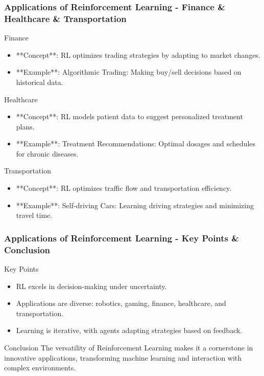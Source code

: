\documentclass[aspectratio=169]{beamer}
\begin{document}
\begin{frame}[fragile]
    \frametitle{Applications of Reinforcement Learning - Finance \& Healthcare \& Transportation}
    \begin{block}{Finance}
        \begin{itemize}
            \item **Concept**: RL optimizes trading strategies by adapting to market changes.
            \item **Example**: Algorithmic Trading: Making buy/sell decisions based on historical data.
        \end{itemize}
    \end{block}

    \begin{block}{Healthcare}
        \begin{itemize}
            \item **Concept**: RL models patient data to suggest personalized treatment plans.
            \item **Example**: Treatment Recommendations: Optimal dosages and schedules for chronic diseases.
        \end{itemize}
    \end{block}

    \begin{block}{Transportation}
        \begin{itemize}
            \item **Concept**: RL optimizes traffic flow and transportation efficiency.
            \item **Example**: Self-driving Cars: Learning driving strategies and minimizing travel time.
        \end{itemize}
    \end{block}
\end{frame}

\begin{frame}[fragile]
    \frametitle{Applications of Reinforcement Learning - Key Points \& Conclusion}
    \begin{block}{Key Points}
        \begin{itemize}
            \item RL excels in decision-making under uncertainty.
            \item Applications are diverse: robotics, gaming, finance, healthcare, and transportation.
            \item Learning is iterative, with agents adapting strategies based on feedback.
        \end{itemize}
    \end{block}

    \begin{block}{Conclusion}
        The versatility of Reinforcement Learning makes it a cornerstone in innovative applications, transforming machine learning and interaction with complex environments.
    \end{block}
\end{frame}
\end{document}
